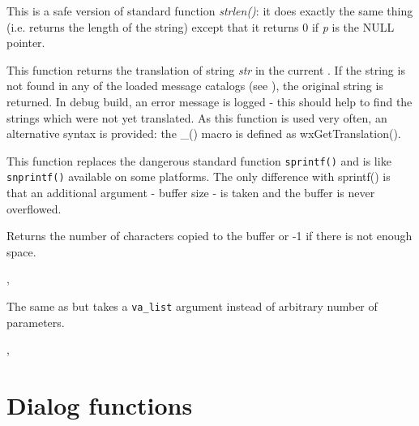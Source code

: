 \label{strlen}


This is a safe version of standard function {\it strlen()}: it does exactly the
same thing (i.e. returns the length of the string) except that it returns 0 if
{\it p} is the NULL pointer.

\label{wxgettranslation}


This function returns the translation of string {\it str} in the current 
. If the string is not found in any of the loaded
message catalogs (see ), the
original string is returned. In debug build, an error message is logged - this
should help to find the strings which were not yet translated. As this function
is used very often, an alternative syntax is provided: the \_() macro is
defined as wxGetTranslation().

\label{wxsnprintf}


This function replaces the dangerous standard function {\tt sprintf()} and is
like {\tt snprintf()} available on some platforms. The only difference with
sprintf() is that an additional argument - buffer size - is taken and the
buffer is never overflowed.

Returns the number of characters copied to the buffer or -1 if there is not
enough space.


, 

\label{wxvsnprintf}


The same as  but takes a {\tt va\_list}
argument instead of arbitrary number of parameters.


, 

\section{Dialog functions}\label{dialogfunctions}

